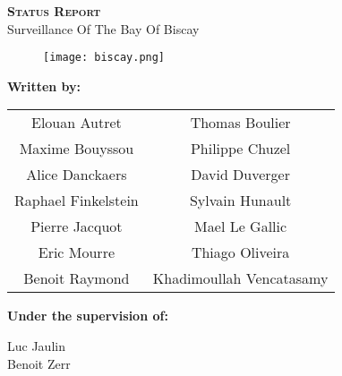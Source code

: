 
\begingroup
\thispagestyle{empty}
\begin{center}
\vspace*{2cm}
{\Huge \textsc{\textbf{Status Report}}}\\


\vspace*{2cm}
{\huge Surveillance Of The Bay Of Biscay}\par %
\end{center}
\begin{figure}[H]
\centering
    \texttt{[image: biscay.png]}
\end{figure}

\vspace*{1.5cm}
\textbf{\large Written by:} 
\begin{center}
{\large
\begin{tabular}{cc}
Elouan Autret & Thomas Boulier\\
Maxime Bouyssou & Philippe Chuzel\\
Alice Danckaers & David Duverger\\
Raphael Finkelstein & Sylvain Hunault\\
Pierre Jacquot & Mael Le Gallic\\
Eric Mourre & Thiago Oliveira\\
Benoit Raymond & Khadimoullah Vencatasamy\\
\end{tabular}}
\end{center}


\vspace*{1.5 cm}
{\large \textbf{Under the supervision of:}}\\
\begin{center}
{\large
Luc Jaulin\\
Benoit Zerr\\}
\end{center}
\endgroup
